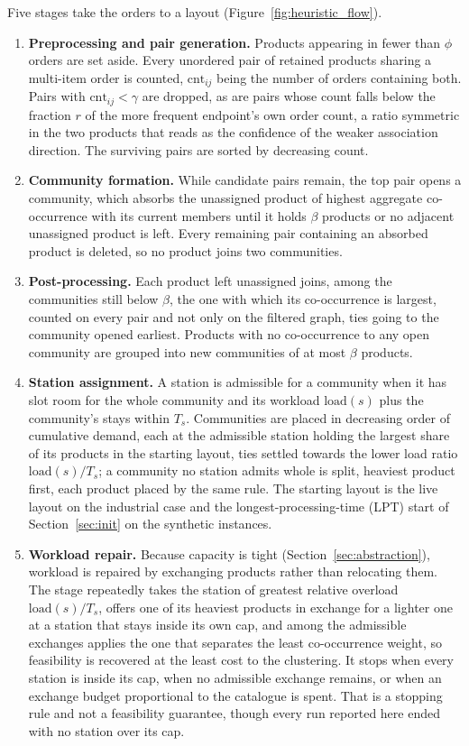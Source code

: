 \documentclass[]{interact}
\begin{document}
Five stages take the orders to a layout (Figure~\ref{fig:heuristic_flow}).
\begin{enumerate}
\item \textbf{Preprocessing and pair generation.} Products appearing in fewer than $\phi$ orders are set aside. Every unordered pair of retained products sharing a multi-item order is counted, $\mathrm{cnt}_{ij}$ being the number of orders containing both. Pairs with $\mathrm{cnt}_{ij}<\gamma$ are dropped, as are pairs whose count falls below the fraction $r$ of the more frequent endpoint's own order count, a ratio symmetric in the two products that reads as the confidence of the weaker association direction. The surviving pairs are sorted by decreasing count.
\item \textbf{Community formation.} While candidate pairs remain, the top pair opens a community, which absorbs the unassigned product of highest aggregate co-occurrence with its current members until it holds $\beta$ products or no adjacent unassigned product is left. Every remaining pair containing an absorbed product is deleted, so no product joins two communities.
\item \textbf{Post-processing.} Each product left unassigned joins, among the communities still below $\beta$, the one with which its co-occurrence is largest, counted on every pair and not only on the filtered graph, ties going to the community opened earliest. Products with no co-occurrence to any open community are grouped into new communities of at most $\beta$ products.
\item \textbf{Station assignment.} A station is admissible for a community when it has slot room for the whole community and its workload $\mathrm{load}(s)$ plus the community's stays within $T_s$. Communities are placed in decreasing order of cumulative demand, each at the admissible station holding the largest share of its products in the starting layout, ties settled towards the lower load ratio $\mathrm{load}(s)/T_s$; a community no station admits whole is split, heaviest product first, each product placed by the same rule. The starting layout is the live layout on the industrial case and the longest-processing-time (LPT) start of Section~\ref{sec:init} on the synthetic instances.
\item \textbf{Workload repair.} Because capacity is tight (Section~\ref{sec:abstraction}), workload is repaired by exchanging products rather than relocating them. The stage repeatedly takes the station of greatest relative overload $\mathrm{load}(s)/T_s$, offers one of its heaviest products in exchange for a lighter one at a station that stays inside its own cap, and among the admissible exchanges applies the one that separates the least co-occurrence weight, so feasibility is recovered at the least cost to the clustering. It stops when every station is inside its cap, when no admissible exchange remains, or when an exchange budget proportional to the catalogue is spent. That is a stopping rule and not a feasibility guarantee, though every run reported here ended with no station over its cap.
\end{enumerate}
\end{document}
